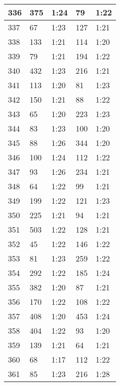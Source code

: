\begin{center}
\begin{longtable}{|p{2cm}|l|l|l|l|}
336	&   375           &  1:24  &		79      	& 1:22 \\ \hline
337	&   67            &  1:23  &		127     	& 1:21 \\ \hline
338	&   133           &  1:21  &		114     	& 1:20 \\ \hline
339	&   79            &  1:21  &		194     	& 1:22 \\ \hline
340	&   432           &  1:23  &		216     	& 1:21 \\ \hline
341	&   113           &  1:20  &		81      	& 1:23 \\ \hline
342	&   150           &  1:21  &		88      	& 1:22 \\ \hline
343	&   65            &  1:20  &		223     	& 1:23 \\ \hline
344	&   83            &  1:23  &		100     	& 1:20 \\ \hline
345	&   88            &  1:26  &		344     	& 1:20 \\ \hline
346	&   100           &  1:24  &		112     	& 1:22 \\ \hline
347	&   93            &  1:26  &		234     	& 1:21 \\ \hline
348	&   64            &  1:22  &		99          & 1:21 \\ \hline
349	&   199           &  1:22  &		121     	& 1:23 \\ \hline
350	&   225           &  1:21  &		94      	& 1:21 \\ \hline
351	&   503           &  1:22  &		128     	& 1:21 \\ \hline
352	&   45            &  1:22  &		146     	& 1:22 \\ \hline
353	&   81            &  1:23  &		259     	& 1:22 \\ \hline
354	&   292           &  1:22  &		185     	& 1:24 \\ \hline
355	&   382           &  1:20  &		87      	& 1:21 \\ \hline
356	&   170           &  1:22  &		108     	& 1:22 \\ \hline
357	&   408           &  1:20  &		453     	& 1:24 \\ \hline
358	&   404           &  1:22  &		93      	& 1:20 \\ \hline
359	&   139           &  1:21  &		64      	& 1:21 \\ \hline
360	&   68            &  1:17  &		112     	& 1:22 \\ \hline
361	&   85            &  1:23  &		216     	& 1:28 \\ \hline

\end{longtable}
\end{center}

